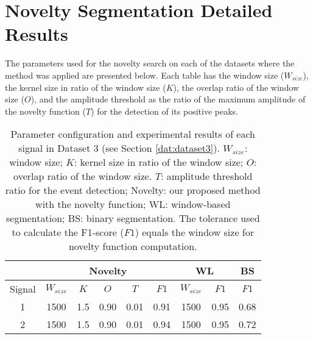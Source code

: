 \section{Novelty Segmentation Detailed Results}

The parameters used for the novelty search on each of the datasets where the method was applied are presented below. Each table has the window size ($W_{size}$), the kernel size in ratio of the window size ($K$), the overlap ratio of the window size ($O$), and the amplitude threshold as the ratio of the maximum amplitude of the novelty function ($T$) for the detection of its positive peaks.

\begin{table}
    \caption{Parameter configuration and experimental results of each signal in Dataset 3 (see Section \ref{dat:dataset3}). $W_{size}$: window size; $K$: kernel size in ratio of the window size; $O$: overlap ratio of the window size. $T$: amplitude threshold ratio for the event detection; Novelty: our proposed method with the novelty function; WL: window-based segmentation; BS: binary segmentation. The tolerance used to calculate the F1-score ($F1$) equals the window size for novelty function computation.}
    \label{tab:params_results_1}
    \centering
    \begin{tabular}{ccccccccc}
    \toprule
    & \multicolumn{5}{c}{Novelty} & \multicolumn{2}{c}{WL} & BS\\
    \midrule
    Signal &     $W_{size}$ &     $K$ &     $O$ &   $T$    &     $F1$ & $W_{size}$ & $F1$ & $F1$\\
    \cmidrule(lr){2-6} \cmidrule(lr){7-8} \cmidrule(lr){9-9}
    1 & 1500 & 1.5 & 0.90 & 0.01 & 0.91 & 1500 & 0.95 & 0.68 \\
    2 & 1500 & 1.5 & 0.90 & 0.01 & 0.94 & 1500 & 0.95 & 0.72 \\
    \bottomrule
    \end{tabular}
\end{table}


